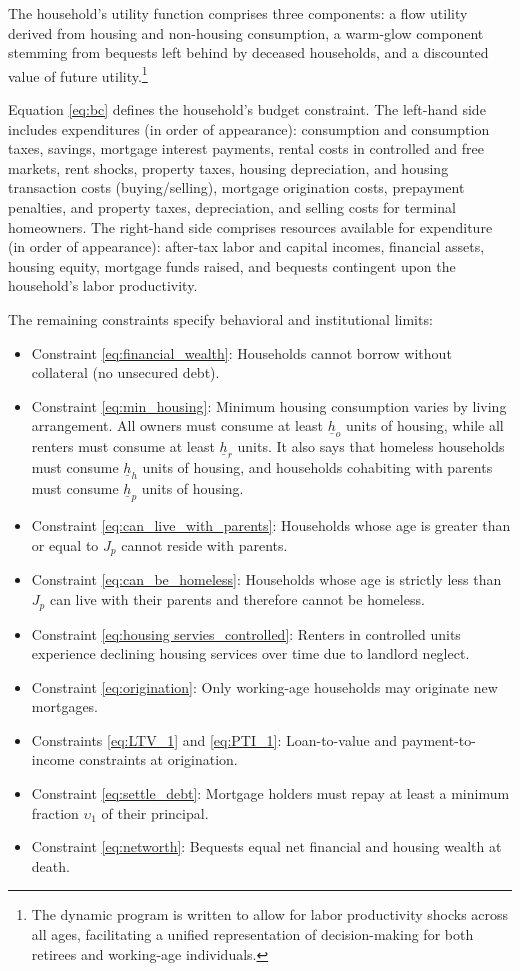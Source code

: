 \documentclass[parskip=full]{article}
\begin{document}
\noindent The household's utility function comprises three components: a flow utility derived from housing and non-housing consumption, a warm-glow component stemming from bequests left behind by deceased households, and a discounted value of future utility.\footnote{The dynamic program is written to allow for labor productivity shocks across all ages, facilitating a unified representation of decision-making for both retirees and working-age individuals.}

Equation \eqref{eq:bc} defines the household's budget constraint. The left-hand side includes expenditures (in order of appearance): consumption and consumption taxes, savings, mortgage interest payments, rental costs in controlled and free markets, rent shocks, property taxes, housing depreciation, and housing transaction costs (buying/selling), mortgage origination costs, prepayment penalties, and property taxes, depreciation, and selling costs for terminal homeowners. The right-hand side comprises resources available for expenditure (in order of appearance): after-tax labor and capital incomes, financial assets, housing equity, mortgage funds raised, and bequests contingent upon the household's labor productivity. 

The remaining constraints specify behavioral and institutional limits: 
\begin{itemize}
    \item Constraint \eqref{eq:financial_wealth}: Households cannot borrow without collateral (no unsecured debt).
    \item Constraint \eqref{eq:min_housing}: Minimum housing consumption varies by living arrangement. All owners must consume at least $\underline{h}_{o}$ units of housing, while all renters must consume at least $\underline{h}_{r}$ units. It also says that homeless households must consume $\underline{h}_{h}$ units of housing, and households cohabiting with parents must consume $\underline{h}_{p}$ units of housing.
    \item Constraint \eqref{eq:can_live_with_parents}: Households whose age is greater than or equal to $J_{p}$ cannot reside with parents.
    \item Constraint \eqref{eq:can_be_homeless}: Households whose age is strictly less than $J_{p}$ can live with their parents and therefore cannot be homeless.
    \item Constraint \eqref{eq:housing servies_controlled}: Renters in controlled units experience declining housing services over time due to landlord neglect. 
    \item Constraint \eqref{eq:origination}: Only working-age households may originate new mortgages.
    \item Constraints \eqref{eq:LTV_1} and \eqref{eq:PTI_1}: Loan-to-value and payment-to-income constraints at origination.
    \item Constraint \eqref{eq:settle_debt}: Mortgage holders must repay at least a minimum fraction $\upsilon_{1}$ of their principal.
    \item Constraint \eqref{eq:networth}: Bequests equal net financial and housing wealth at death.
\end{itemize} 
\end{document}

